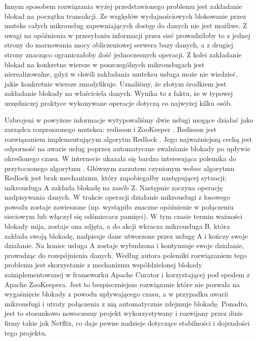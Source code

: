 \documentclass[licencjacka]{pracamgr}
\begin{document}
Innym sposobem rozwiązania wyżej przedstawionego problemu jest zakładanie blokad na początku transakcji.
Ze względów wydajnościowych blokowanie przez muteks
całych mikrousług zapewniających dostęp do danych nie jest możliwe. Z uwagi na opóźnienia w przesyłaniu informacji
przez sieć prowadziłoby to z jednej strony do marnowania mocy obliczeniowej serwera bazy danych, a z drugiej strony
znacząco ograniczałoby ilość jednoczesnych operacji. Z kolei zakładanie blokad na konkretne wiersze w poszczególnych
mikrousługach jest nierealizowalne, gdyż w chwili zakładania muteksu usługa może nie wiedzieć, jakie konkretnie
wiersze zmodyfikuje. Uznaliśmy, że złotym środkiem jest zakładanie blokady na właściciela danych. Wynika to z
faktu, że w typowej urzędniczej praktyce wykonywane operacje dotyczą co najwyżej kilku osób.

Uzbrojeni w powyższe informacje wytypowaliśmy dwie usługi mogące działać jako zarządca rozproszonego muteksa:
redisson \cite{redisson} i ZooKeeper \cite{zookeeper}. Redisson jest rozwiązaniem implementującym algorytm Redlock
\cite{redislock}. Jego najważniejszą cechą jest odporność na awarie usług poprzez automatyczne zwalnianie blokady
po upływie określonego czasu. W internecie ukazała się bardzo interesująca polemika do przytoczonego algorytmu \cite{redisbad}.
Głównym zarzutem czynionym wobec algorytmu Redlock jest brak mechanizmu, który zapobiegałby następującej sytuacji:
mikrousługa A zakłada blokadę na zasób Z. Następnie zaczyna operację nadpisywania danych. W trakcie operacji
działanie mikrousługi z losowego powodu zostaje zawieszone (np. wystąpiło znaczne opóźnienie w połączeniu sieciowym
lub włączył się odśmiecacz pamięci). W tym czasie termin ważności blokady mija, zostaje ona zdjęta, a do akcji
wkracza mikrousługa B, która zakłada swoją blokadę, nadpisuje dane utworzone przez usługę A i kończy swoje
działanie. Na koniec usługa A zostaje wybudzona i kontynuuje swoje działanie, prowadząc do rozspójnienia danych.
Według autora polemiki rozwiązaniem tego problemu jest skorzystanie z mechanizmu współdzielonej blokady
zaimplementowanej w frameworku Apache Curator \cite{curatorlock} i korzystającej pod spodem z Apache ZooKeepera.
Jest to bezpieczniejsze rozwiązanie które nie pozwala na wygaśnięcie blokady z powodu upływającego
czasu, a w przypadku awarii mikrousługi i utraty połączenia z nią
automatycznie zdejmuje blokadę. Ponadto, jest to stosunkowo nowoczesny projekt wykorzystywany i rozwijany przez
duże firmy takie jak Netflix, co daje pewne nadzieje dotyczące stabilności i dojrzałości tego projektu.
\end{document}
